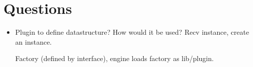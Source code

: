 
\absent{-}
\apologies{-}
\date{31st August, 2011}


\maketitle


\section{Questions}
\begin{itemize}
 \item{Plugin to define datastructure?}
 How would it be used? Recv instance, create an instance.

 Factory (defined by interface), engine loads factory as lib/plugin. 
 
\end{itemize}

\meetingclosed{}


